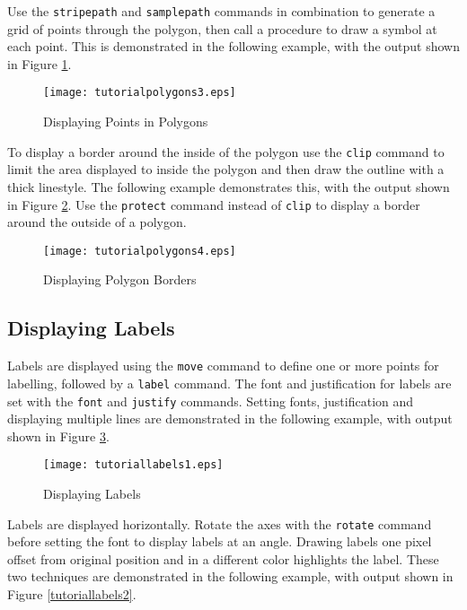 Use the \texttt{stripepath} and \texttt{samplepath}
commands in combination to generate a grid of points through the
polygon, then call a procedure to draw a symbol at each point.
This is demonstrated in the following example, with the output
shown in Figure \ref{tutorialpolygons3}.



\begin{figure}[htb]
\texttt{[image: tutorialpolygons3.eps]}
\caption{Displaying Points in Polygons}
\label{tutorialpolygons3}
\end{figure}

To display a border around the inside of the polygon
use the \texttt{clip}
command to limit the area displayed to inside the polygon
and then draw the outline with a thick linestyle.
The following example demonstrates this, with the output shown
in Figure \ref{tutorialpolygons4}.
Use the \texttt{protect} command instead of \texttt{clip}
to display a border around the outside of a polygon.



\begin{figure}[htb]
\texttt{[image: tutorialpolygons4.eps]}
\caption{Displaying Polygon Borders}
\label{tutorialpolygons4}
\end{figure}

\subsection{Displaying Labels}

Labels are displayed using the \texttt{move}
command to define one or more points for labelling, followed by a
\texttt{label} command.  The font and justification for labels
are set with the \texttt{font} and \texttt{justify} commands.
Setting fonts, justification and displaying multiple lines
are demonstrated in the following example, with output
shown in Figure \ref{tutoriallabels1}.



\begin{figure}[htb]
\texttt{[image: tutoriallabels1.eps]}
\caption{Displaying Labels}
\label{tutoriallabels1}
\end{figure}

Labels are displayed horizontally.  Rotate the axes with the \texttt{rotate}
command before setting the font to display labels at an angle.  Drawing labels
one pixel offset from original position and in a different color highlights the
label.  These two techniques are demonstrated in the following example,
with output shown in Figure \ref{tutoriallabels2}.


